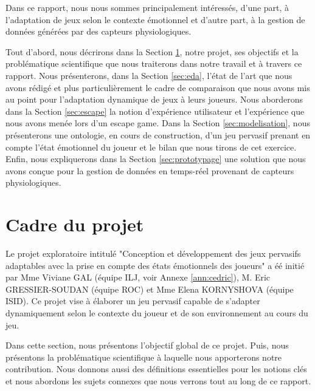 \documentclass[11pt]{article}
\begin{document}
	Dans ce rapport, nous nous sommes principalement intéressés, d'une part, à l'adaptation de jeux selon le contexte émotionnel et d'autre part, à la gestion de données générées par des capteurs physiologiques.\par
	Tout d'abord, nous décrirons dans la Section \ref{sec:projet}, notre projet, ses objectifs et la problématique scientifique que nous traiterons dans notre travail et à travers ce rapport.
	Nous présenterons, dans la Section \ref{sec:eda}, l'état de l'art que nous avons rédigé et plus particulièrement le cadre de comparaison que nous avons mis au point pour l'adaptation dynamique de jeux à leurs joueurs. 
	Nous aborderons dans la Section \ref{sec:escape} la notion d'expérience utilisateur et l'expérience que nous avons menée lors d'un escape game.
	Dans la Section \ref{sec:modelisation}, nous présenterons une ontologie, en cours de construction, d'un jeu pervasif prenant en compte l'état émotionnel du joueur et le bilan que nous tirons de cet exercice.
	Enfin, nous expliquerons dans la Section \ref{sec:prototypage} une solution que nous avons conçue pour la gestion de données en temps-réel provenant de capteurs physiologiques.

\newpage
\section{Cadre du projet}\label{sec:projet}
	Le projet exploratoire intitulé "Conception et développement des jeux pervasifs adaptables avec la prise en compte des états émotionnels des joueurs" a éé initié par Mme Viviane GAL (équipe ILJ, voir Annexe \ref{ann:cedric}), M. Eric GRESSIER-SOUDAN (équipe ROC) et Mme Elena KORNYSHOVA (équipe ISID).
	Ce projet vise à élaborer un jeu pervasif capable de s'adapter dynamiquement selon le contexte du joueur et de son environnement au cours du jeu.\par
	Dans cette section, nous présentons l'objectif global de ce projet.
	Puis, nous présentons la problématique scientifique à laquelle nous apporterons notre contribution.
	Nous donnons aussi des définitions essentielles pour les notions clés et nous abordons les sujets connexes que nous verrons tout au long de ce rapport.
\end{document}
